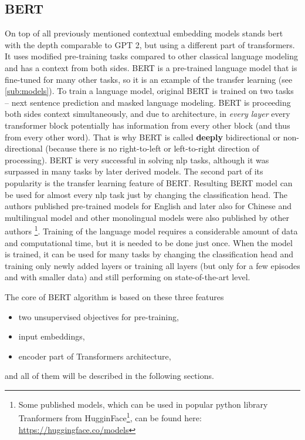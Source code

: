 \subsection{BERT}
On top of all previously mentioned contextual embedding models stands \acrfull{bert} \citep{Devlin2019} with the depth comparable to GPT 2, but using a different part of transformers. It uses modified pre-training tasks compared to other classical language modeling and has a context from both sides. BERT is a pre-trained language model that is fine-tuned for many other tasks, so it is an example of the transfer learning (see \ref{sub:models}).
To train a language model, original BERT is trained on two tasks -- next sentence prediction and masked language modeling. BERT is proceeding both sides context simultaneously, and due to architecture, in \textit{every layer} every transformer block potentially has information from every other block (and thus from every other word). That is why BERT is called \textbf{deeply} bidirectional or non-directional (because there is no right-to-left or left-to-right direction of processing). BERT is very successful in solving \acrshort{nlp} tasks, although it was surpassed in many tasks by later derived models. 
The second part of its popularity is the transfer learning feature of BERT. Resulting BERT model can be used for almost every \acrshort{nlp} task just by changing the classification head. The authors published pre-trained models for English and later also for Chinese and multilingual model and other monolingual models were also published by other authors \footnote{Some published models, which can be used in popular python library Tranformers from HugginFace\footnote{https://huggingface.co/}, can be found here: \url{https://huggingface.co/models}}. Training of the language model requires a considerable amount of data and computational time, but it is needed to be done just once. When the model is trained, it can be used for many tasks by changing the classification head and training only newly added layers or training all layers (but only for a few episodes and with smaller data) and still performing on state-of-the-art level. 
\par
The core of BERT algorithm is based on these three features
\begin{itemize}
\item two unsupervised objectives for pre-training,
\item input embeddings,
\item encoder part of Transformers architecture,
\end{itemize}
and all of them will be described in the following sections.
